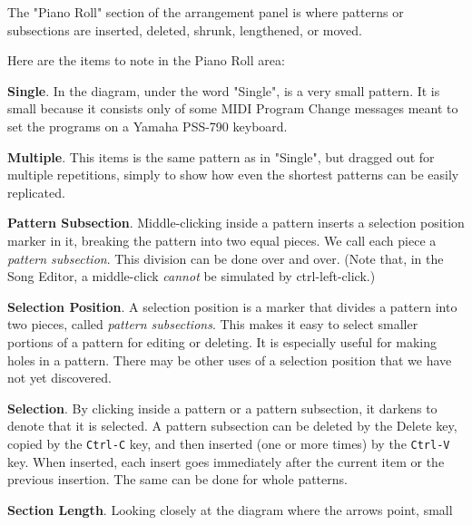   The "Piano Roll" section of the arrangement panel is where patterns or
   subsections are inserted, deleted, shrunk, lengthened, or moved.

   Here are the items to note in the Piano Roll area:

   \begin{enumber}
      \item \textbf{Single}.
         In the diagram, under the word "Single", is a very small pattern.
         It is small because it consists only of some MIDI Program Change
         messages meant to set the programs on a Yamaha PSS-790 keyboard.
      \item \textbf{Multiple}.
         This items is the same pattern as in "Single", but dragged out for
         multiple repetitions, simply to show how even the shortest patterns
         can be easily replicated.
      \item \textbf{Pattern Subsection}.
         Middle-clicking inside a pattern inserts a selection position
         marker in it, breaking the pattern into two equal pieces.
         We call each piece a \textsl{pattern subsection}.
         This division can be done over and over.
         (Note that, in the Song Editor, a middle-click
          \textsl{cannot} be simulated by ctrl-left-click.)
      \item \textbf{Selection Position}.
         A selection position is a marker that divides a pattern into two
         pieces, called \textsl{pattern subsections}.  This makes it easy to
         select smaller portions of a pattern for editing or deleting.  It
         is especially useful for making holes in a pattern.  There may be
         other uses of a selection position that we have not yet discovered.
      \item \textbf{Selection}.
         By clicking inside a pattern or a pattern subsection, it darkens to
         denote that it is selected.
         A pattern subsection can be deleted by the
         Delete key, copied by the
         \texttt{Ctrl-C} key, and then inserted (one or more times) by the
         \texttt{Ctrl-V} key.  When inserted, each insert goes immediately
         after the current item or the previous insertion.  The same can be
         done for whole patterns.
      \item \textbf{Section Length}.
         Looking closely at the diagram where the arrows point, small

\end{enumber}
